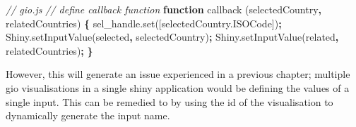 \documentclass[
]{krantz}
\makeatletter
\newenvironment{Shaded}{\begin{snugshade}}{\end{snugshade}}
\newcommand{\AttributeTok}[1]{\textcolor[rgb]{0.61,0.61,0.61}{#1}}
\newcommand{\CommentTok}[1]{\textcolor[rgb]{0.37,0.37,0.37}{\textit{#1}}}
\newcommand{\KeywordTok}[1]{\textcolor[rgb]{0.27,0.27,0.27}{\textbf{#1}}}
\newcommand{\NormalTok}[1]{#1}
\newcommand{\OperatorTok}[1]{\textcolor[rgb]{0.43,0.43,0.43}{\textbf{#1}}}
\newcommand{\StringTok}[1]{\textcolor[rgb]{0.5,0.5,0.5}{#1}}
\newcommand{\VariableTok}[1]{\textcolor[rgb]{0,0,0}{#1}}
\newenvironment{kframe}{%
\medskip{}
\setlength{\fboxsep}{.8em}
 \def\at@end@of@kframe{}%
 \ifinner\ifhmode%
  \def\at@end@of@kframe{\end{minipage}}%
  \begin{minipage}{\columnwidth}%
 \fi\fi%
 \def\FrameCommand##1{\hskip\@totalleftmargin \hskip-\fboxsep
 \colorbox{shadecolor}{##1}\hskip-\fboxsep
     \hskip-\linewidth \hskip-\@totalleftmargin \hskip\columnwidth}%
 \MakeFramed {\advance\hsize-\width
   \@totalleftmargin\z@ \linewidth\hsize
   \@setminipage}}%
 {\par\unskip\endMakeFramed%
 \at@end@of@kframe}
\renewenvironment{Shaded}{\begin{kframe}}{\end{kframe}}
\makeatother
\begin{document}
\begin{Shaded}
\begin{Highlighting}[]
\CommentTok{// gio.js}
\CommentTok{// define callback function}
\KeywordTok{function} \AttributeTok{callback}\NormalTok{ (selectedCountry}\OperatorTok{,}\NormalTok{ relatedCountries) }\OperatorTok{\{}
  \VariableTok{sel\_handle}\NormalTok{.}\AttributeTok{set}\NormalTok{([}\VariableTok{selectedCountry}\NormalTok{.}\AttributeTok{ISOCode}\NormalTok{])}\OperatorTok{;}
  \VariableTok{Shiny}\NormalTok{.}\AttributeTok{setInputValue}\NormalTok{(}\StringTok{\textquotesingle{}selected\textquotesingle{}}\OperatorTok{,}\NormalTok{ selectedCountry)}\OperatorTok{;}
  \VariableTok{Shiny}\NormalTok{.}\AttributeTok{setInputValue}\NormalTok{(}\StringTok{\textquotesingle{}related\textquotesingle{}}\OperatorTok{,}\NormalTok{ relatedCountries)}\OperatorTok{;}
\OperatorTok{\}}
\end{Highlighting}
\end{Shaded}

However, this will generate an issue experienced in a previous chapter; multiple gio visualisations in a single shiny application would be defining the values of a single input. This can be remedied to by using the id of the visualisation to dynamically generate the input name.
\end{document}
